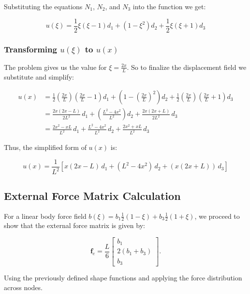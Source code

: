 Substituting the equations \( N_1 \), \( N_2 \), and \( N_3 \) into the function we get:

\begin{equation}
    u(\xi) = \frac{1}{2} \xi (\xi - 1) d_1 + (1 - \xi^2) d_2 + \frac{1}{2} \xi (\xi + 1) d_3
\end{equation}

\subsubsection*{Transforming \( u(\xi) \) to \( u(x) \)}

The problem gives us the value for \( \xi = \frac{2x}{L} \). So to finalize the displacement field we substitute and simplify:

\begin{align*}
    u(x) &= \frac{1}{2} \left( \frac{2x}{L} \right) \left( \frac{2x}{L} - 1 \right) d_1 + \left( 1 - \left( \frac{2x}{L} \right)^2 \right) d_2 + \frac{1}{2} \left( \frac{2x}{L} \right) \left( \frac{2x}{L} + 1 \right) d_3 \\
    &= \frac{2x (2x - L)}{2L^2} \, d_1 + \left( \frac{L^2 - 4x^2}{L^2} \right) d_2 + \frac{2x (2x + L)}{2L^2} \, d_3 \\
    &= \frac{2x^2 - xL}{L^2} \, d_1 + \frac{L^2 - 4x^2}{L^2} \, d_2 + \frac{2x^2 + xL}{L^2} \, d_3
\end{align*}

Thus, the simplified form of \( u(x) \) is:

\begin{equation*}
    u(x) = \frac{1}{L^2}\left[ x(2x-L)  \, d_1 + \left( L^{2}-4x^2 \right) \, d_2 + \left( x(2x+L) \right) \, d_3 \right]
\end{equation*}

\subsection*{External Force Matrix Calculation}

For a linear body force field \( b(\xi) = b_1 \frac{1}{2}(1 - \xi) + b_3 \frac{1}{2}(1 + \xi) \), we proceed to show that the external force matrix is given by:

\[
\mathbf{f}_e = \frac{L}{6} \begin{bmatrix} b_1 \\ 2(b_1 + b_3) \\ b_3 \end{bmatrix}.
\]

Using the previously defined shape functions and applying the force distribution across nodes.

